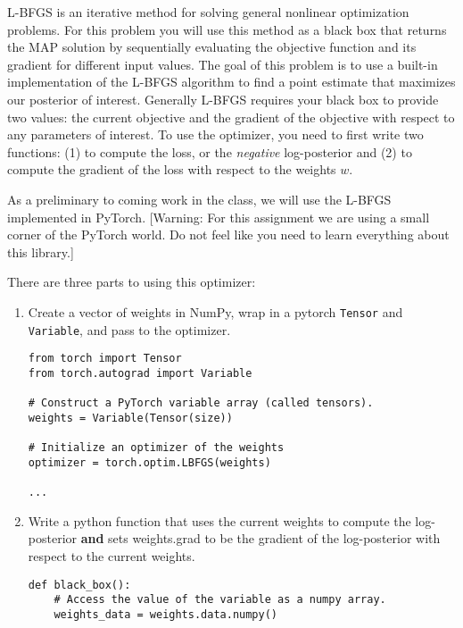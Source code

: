 \documentclass{harvardml}
\begin{document}
\begin{problem}[14pts]\label{prob:numerical_linear_model}
  L-BFGS is an iterative method for solving general nonlinear
  optimization problems. For this problem you will use this method as
  a black box that returns the MAP solution by sequentially evaluating
  the objective function and its gradient for different input
  values. The goal of this problem is to use a built-in implementation
  of the L-BFGS algorithm to find a point estimate that maximizes our
  posterior of interest. Generally L-BFGS requires your black box to
  provide two values: the current objective and the gradient of the
  objective with respect to any parameters of interest. To use the optimizer, you need to
first write two functions: (1) to compute the loss, or the
\textit{negative} log-posterior and (2) to compute the gradient of the
loss with respect to the weights $w$.

\smallskip

As a preliminary to coming work in the class, we will use the L-BFGS
implemented in PyTorch. [Warning: For this assignment we are using a
small corner of the PyTorch world. Do not feel like you need to learn
everything about this library.]

There are three parts to using this optimizer:

\begin{enumerate}
\item  Create a vector of weights in NumPy,  wrap in a pytorch \texttt{Tensor} and  \texttt{Variable},
and pass to the optimizer.
\begin{verbatim}
from torch import Tensor
from torch.autograd import Variable

# Construct a PyTorch variable array (called tensors).
weights = Variable(Tensor(size))

# Initialize an optimizer of the weights
optimizer = torch.optim.LBFGS(weights)

...
\end{verbatim}

\item Write a python function that uses the
current weights  to compute the log-posterior
\textbf{and} sets weights.grad to be the gradient of the log-posterior
with respect to the current weights.



\begin{verbatim}
def black_box():
    # Access the value of the variable as a numpy array.
    weights_data = weights.data.numpy()


\end{verbatim}
\end{enumerate}
\end{problem}
\end{document}

